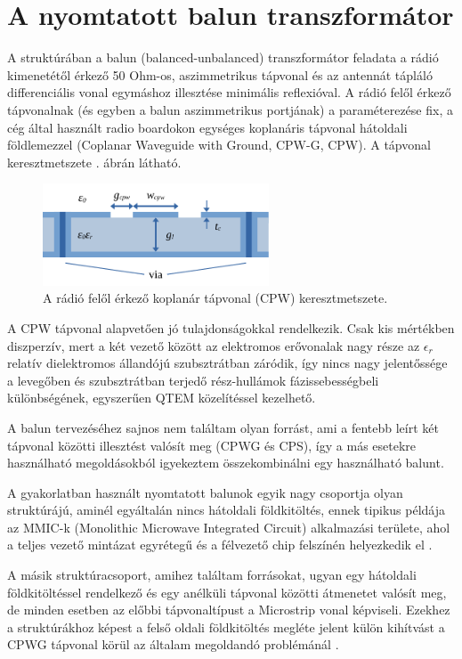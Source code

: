 \section{A nyomtatott balun transzformátor}
	A struktúrában a balun (balanced-unbalanced) transzformátor feladata a rádió kimenetétől érkező 50 Ohm-os, aszimmetrikus tápvonal és az antennát tápláló differenciális vonal egymáshoz illesztése minimális reflexióval. A rádió felől érkező tápvonalnak (és egyben a balun aszimmetrikus portjának) a paraméterezése fix, a cég által használt radio boardokon egységes koplanáris tápvonal hátoldali földlemezzel (Coplanar Waveguide with Ground, CPW-G, CPW). A tápvonal keresztmetszete . ábrán látható.
\begin{figure}[h]
	\centering
	\includegraphics[width=0.6\textwidth]{kep/cpw.pdf}
	\caption{A rádió felől érkező koplanár tápvonal (CPW) keresztmetszete.}
	\label{fig:cpw}
\end{figure}
	A CPW tápvonal alapvetően jó tulajdonságokkal rendelkezik. Csak kis mértékben diszperzív, mert a két vezető között az elektromos erővonalak nagy része az $\epsilon_r$ relatív dielektromos állandójú szubsztrátban záródik, így nincs nagy jelentőssége a levegőben és szubsztrátban terjedő rész-hullámok fázissebességbeli különbségének, egyszerűen QTEM közelítéssel kezelhető.
\par A balun tervezéséhez sajnos nem találtam olyan forrást, ami a fentebb leírt két tápvonal közötti illesztést valósít meg (CPWG és CPS), így a más esetekre használható megoldásokból igyekeztem összekombinálni egy használható balunt.
\par A gyakorlatban használt nyomtatott balunok egyik nagy csoportja olyan struktúrájú, aminél egyáltalán nincs hátoldali földkitöltés, ennek tipikus példája az MMIC-k (Monolithic Microwave Integrated Circuit) alkalmazási területe, ahol a teljes vezető mintázat egyrétegű és a félvezető chip felszínén helyezkedik el \cite{cpw-ccs, easy-balun, 0-55GHz, 0-110GHz}.
\par A másik struktúracsoport, amihez találtam forrásokat, ugyan egy hátoldali földkitöltéssel rendelkező és egy anélküli tápvonal közötti átmenetet valósít meg, de minden esetben az előbbi tápvonaltípust a Microstrip vonal képviseli. Ezekhez a struktúrákhoz képest a felső oldali földkitöltés megléte jelent külön kihítvást a CPWG tápvonal körül az általam megoldandó problémánál \cite{cpw-ccs, uwb-ms-cps, conv-balun-1, conv-balun-2, wb-cps-ms}.

